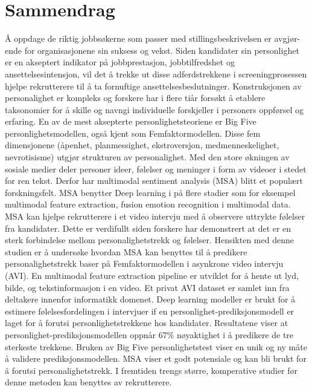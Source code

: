 \chapter*{Sammendrag}
Å oppdage de riktig jobbsøkerne som passer med stillingsbeskrivelsen er avgjør-ende for organisasjonene sin suksess og vekst. Siden kandidater sin personlighet er en akseptert indikator på jobbprestasjon, jobbtilfredshet og ansettelsesintensjon, vil det å trekke ut disse adferdstrekkene i screeningprosessen hjelpe rekrutterere til å ta fornuftige ansettelsesbeslutninger. Konstruksjonen av personalighet er kompleks og forskere har i flere tiår forsøkt å etablere taksonomier for å skille og navngi individuelle forskjeller i personers oppførsel og erfaring. En av de mest aksepterte personlighetsteoriene er Big Five personlighetsmodellen, også kjent som Femfaktormodellen. Disse fem dimensjonene (åpenhet, planmessighet, ekstroversjon, medmenneskelighet, nevrotisisme) utgjør strukturen av personalighet. Med den store økningen av sosiale medier deler personer ideer, følelser og meninger i form av videoer i stedet for ren tekst. Derfor har multimodal sentiment analysis (MSA) blitt et populært forskningsfelt. MSA benytter Deep learning i på flere stadier som for eksempel multimodal feature extraction, fusion emotion recognition i multimodal data. MSA kan hjelpe rekrutterere i et video intervju med å observere uttrykte følelser fra kandidater. Dette er verdifullt siden forskere har demonstrert at det er en sterk forbindelse mellom personalighetstrekk og følelser. Hensikten med denne studien er å undersøke hvordan MSA kan benyttes til å predikere personalighetstrekk baser på Femfaktormodellen i asynkrone video intervju (AVI). En multimodal feature extraction pipeline er utviklet for å hente ut lyd, bilde, og tekstinformasjon i en video. Et privat AVI dataset er samlet inn fra deltakere innenfor informatikk domenet. Deep learning modeller er brukt for å estimere følelsesfordelingen i intervjuer if en personlighet-prediksjonsmodell er laget for å forutsi personlighetstrekkene hos kandidater. Resultatene viser at personlighet-prediksjonsmodellen oppnår 67\% nøyaktighet i å predikere de tre sterkeste trekkene. Bruken av Big Five personlighetstest viser en unik og ny måte å validere prediksjonsmodellen. MSA viser et godt potensiale og kan bli brukt for å forutsi personalighetstrekk. I fremtiden trengs større, komperative studier før denne metoden kan benyttes av rekrutterere. 



